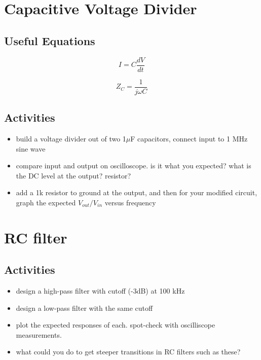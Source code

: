 \documentclass[11pt]{article}
\begin{document}
\section{Capacitive Voltage Divider}

\subsection{Useful Equations}
\begin{equation}
I=C\frac{dV}{dt}
\end{equation}

\begin{equation}
Z_C = \frac1{j\omega C}
\end{equation}

\subsection{Activities}

\begin{itemize}
\item build a voltage divider out of two 1$\mu$F capacitors, connect input to 1 MHz sine wave
\item compare input and output on oscilloscope.  is it what you expected? what is the DC level at the output?
resistor?
\item add a 1k resistor to ground at the output, and then for your modified circuit, graph the 
expected $V_{out}/V_{in}$ versus frequency
\end{itemize}

\section{RC filter}

\subsection{Activities}
\begin{itemize}
\item design a high-pass filter with cutoff (-3dB) at 100 kHz
\item design a low-pass filter with the same cutoff
\item plot the expected responses of each.  spot-check with oscilliscope measurements.
\item what could you do to get steeper transitions in RC filters such as these?
\end{itemize}
\end{document}
